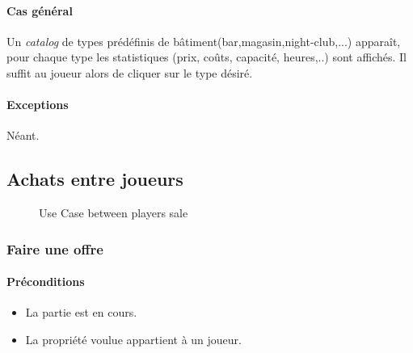 \documentclass[a4paper,11pt]{report}
\begin{document}
\paragraph{Cas général}
Un \textit{catalog} de types prédéfinis de bâtiment(bar,magasin,night-club,...) apparaît, pour chaque type les statistiques (prix, coûts, capacité, heures,..) sont affichés. Il suffit au joueur alors de cliquer sur le type désiré.
\paragraph{Exceptions} Néant.



\newpage
\subsection{Achats entre joueurs}
\begin{figure}[ht]
    \caption{Use Case between players sale}
\end{figure}
\subsubsection{Faire une offre}
\paragraph{Préconditions}
\begin{itemize}
 \item La partie est en cours.
 \item La propriété voulue appartient à un joueur.
\end{itemize}
\end{document}
